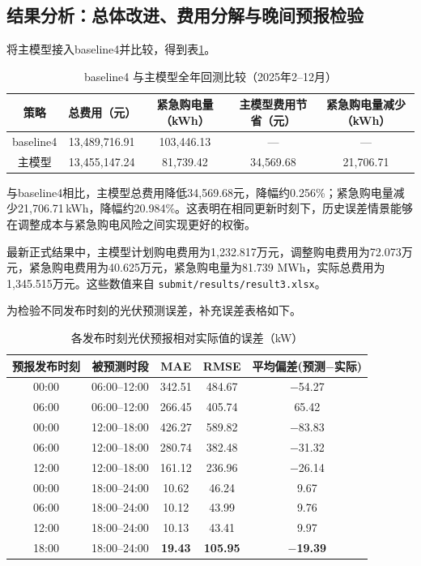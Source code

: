 \subsection{结果分析：总体改进、费用分解与晚间预报检验}
\label{sec:q3-analysis}
将主模型接入baseline4并比较，得到表\ref{tab:q3-all-cost}。

\begin{table}[H]
  \centering
  \caption{baseline4 与主模型全年回测比较（2025年2--12月）}
  \label{tab:q3-all-cost}
  \small
  \renewcommand{\arraystretch}{1.3}
  \begin{tabular}{|c|c|c|c|c|}
    \hline
    策略 & 总费用（元） & 紧急购电量（kWh） & 主模型费用节省（元） & 紧急购电量减少（kWh） \\
    \hline
    baseline4 & 13{,}489{,}716.91 & 103{,}446.13 & --- & --- \\
    \hline
    主模型 & 13{,}455{,}147.24 & 81{,}739.42 & 34{,}569.68 & 21{,}706.71 \\
    \hline
  \end{tabular}
\end{table}

与baseline4相比，主模型总费用降低34{,}569.68元，降幅约0.256\%；紧急购电量减少21{,}706.71\,kWh，降幅约20.984\%。这表明在相同更新时刻下，历史误差情景能够在调整成本与紧急购电风险之间实现更好的权衡。

最新正式结果中，主模型计划购电费用为1{,}232.817万元，调整购电费用为72.073万元，紧急购电费用为40.625万元，紧急购电量为81.739 MWh，实际总费用为1{,}345.515万元。这些数值来自 \texttt{submit/results/result3.xlsx}。

为检验不同发布时刻的光伏预测误差，补充误差表格如下。

\begin{table}[H]
  \centering
  \caption{各发布时刻光伏预报相对实际值的误差（kW）}
  \label{tab:q3-pv-error}
  \small
  \renewcommand{\arraystretch}{1.3}
  \begin{tabular}{|c|c|c|c|c|}
    \hline
    预报发布时刻 & 被预测时段 & MAE & RMSE & 平均偏差(预测$-$实际) \\
    \hline
    00:00 & 06:00--12:00 & 342.51 & 484.67 & $-$54.27 \\
    \hline
    06:00 & 06:00--12:00 & 266.45 & 405.74 & 65.42 \\
    \hline
    00:00 & 12:00--18:00 & 426.27 & 589.82 & $-$83.83 \\
    \hline
    06:00 & 12:00--18:00 & 280.74 & 382.48 & $-$31.32 \\
    \hline
    12:00 & 12:00--18:00 & 161.12 & 236.96 & $-$26.14 \\
    \hline
    00:00 & 18:00--24:00 & 10.62 & 46.24 & 9.67 \\
    \hline
    06:00 & 18:00--24:00 & 10.12 & 43.99 & 9.76 \\
    \hline
    12:00 & 18:00--24:00 & 10.13 & 43.41 & 9.97 \\
    \hline
    18:00 & 18:00--24:00 & \textbf{19.43} & \textbf{105.95} & \textbf{$-$19.39} \\
    \hline
  \end{tabular}
\end{table}

